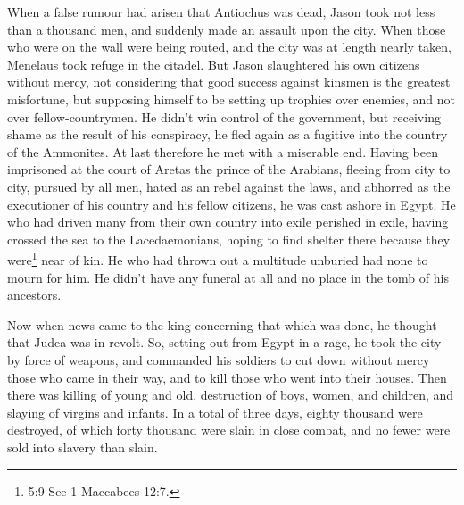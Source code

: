  When a false rumour had arisen that Antiochus was dead,
Jason took not less than a thousand men, and suddenly made an assault
upon the city. When those who were on the wall were being routed, and
the city was at length nearly taken, Menelaus took refuge in the
citadel.  But Jason slaughtered his own citizens without
mercy, not considering that good success against kinsmen is the greatest
misfortune, but supposing himself to be setting up trophies over
enemies, and not over fellow-countrymen.  He didn't win
control of the government, but receiving shame as the result of his
conspiracy, he fled again as a fugitive into the country of the
Ammonites.  At last therefore he met with a miserable end.
Having been imprisoned at the court of Aretas the prince of the
Arabians, fleeing from city to city, pursued by all men, hated as an
rebel against the laws, and abhorred as the executioner of his country
and his fellow citizens, he was cast ashore in Egypt.  He
who had driven many from their own country into exile perished in exile,
having crossed the sea to the Lacedaemonians, hoping to find shelter
there because they were\footnote{5:9 See 1 Maccabees 12:7.} near of kin.
 He who had thrown out a multitude unburied had none to
mourn for him. He didn't have any funeral at all and no place in the
tomb of his ancestors.

 Now when news came to the king concerning that which was
done, he thought that Judea was in revolt. So, setting out from Egypt in
a rage, he took the city by force of weapons,  and
commanded his soldiers to cut down without mercy those who came in their
way, and to kill those who went into their houses.  Then
there was killing of young and old, destruction of boys, women, and
children, and slaying of virgins and infants.  In a total
of three days, eighty thousand were destroyed, of which forty thousand
were slain in close combat, and no fewer were sold into slavery than
slain.

